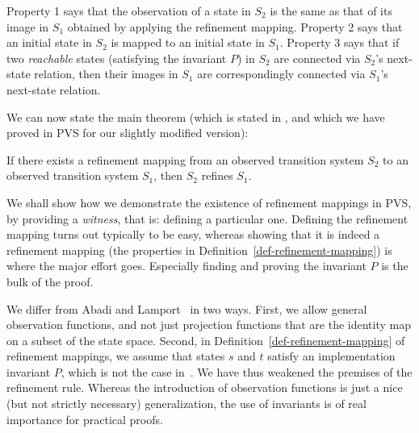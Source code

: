\noindent
Property 1 says that the observation of a state in $S_2$ is the same as that of
its image in $S_1$ obtained by applying the refinement mapping.
%
Property 2 says that an initial state in $S_2$ is mapped to an initial state in $S_1$.
%
Property 3 says that if two {\em reachable} states (satisfying the invariant $P$) 
in $S_2$ are connected via $S_2$'s next-state relation, then their images in $S_1$ 
are correspondingly connected via $S_1$'s next-state relation.

We   can now    state   the  main   theorem   (which  is   stated   in
\cite{AL:Mappings}, and which we have proved in  PVS for our slightly
modified version):

\begin{theorem}
\label{theorem-refinement}
If there exists a refinement mapping from an observed transition system $S_2$
to an observed transition system $S_1$, then $S_2$ refines $S_1$. 

\end{theorem}

We shall show how we demonstrate the  existence of refinement mappings
in PVS,  by providing a {\em witness},  that is: defining a particular
one. Defining the refinement mapping  turns out typically to be  easy,
whereas showing that it is indeed a refinement mapping (the properties
in Definition~\ref{def-refinement-mapping}) is  where the  major  effort
goes.  Especially finding and proving the invariant $P$ is the bulk of
the proof.

We   differ from Abadi  and Lamport~\cite{AL:Mappings} in two
ways.  First, we allow general  observation functions, and not
just projection functions that are the identity map on a subset of   the
state space.   Second, in Definition~\ref{def-refinement-mapping} of
refinement mappings,  we  assume that states  $s$  and $t$  satisfy an
implementation     invariant  $P$,   which    is   not   the  case
in~\cite{AL:Mappings}\@.   We have thus weakened the premises of
the refinement rule.  Whereas the introduction of observation functions
is just a nice (but not   strictly   necessary) generalization,
the use of invariants is of real importance for practical proofs.








